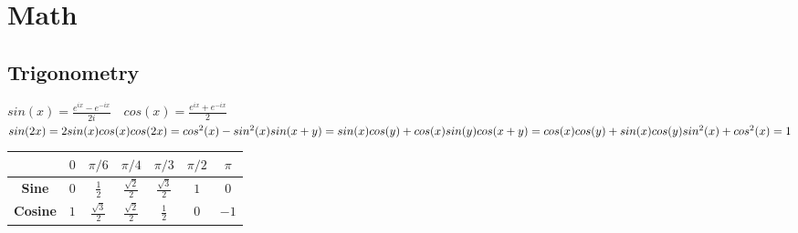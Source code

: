 \section*{Math}
\subsection*{Trigonometry}
$sin(x) = \frac{e^{ix} - e^{-ix}}{2i} \quad cos(x) = \frac{e^{ix} + e^{-ix}}{2}$ \\
$sin(2x) = 2sin(x)cos(x) \\ cos(2x) = cos^2(x) - sin^2(x) \\ sin(x+y) = sin(x)cos(y) + cos(x)sin(y) \\ cos(x+y) = cos(x)cos(y) + sin(x)cos(y) \\ sin^2(x) + cos^2(x) = 1$ \\
\begin{tabular}{|c|c|c|c|c|c|c|}
  \hline
  & $0$ & $\pi/6$ & $\pi/4$ & $\pi/3$ & $\pi/2$ & $\pi$ \\
  \hline
  \textbf{Sine} & $0$ & $\frac{1}{2}$ & $\frac{\sqrt{2}}{2}$ & $\frac{\sqrt{3}}{2}$ & $1$ & $0$ \\
  \hline
  \textbf{Cosine} & $1$ & $\frac{\sqrt{3}}{2}$ & $\frac{\sqrt{2}}{2}$ & $\frac{1}{2}$ & $0$ & $-1$ \\
  \hline
\end{tabular}
